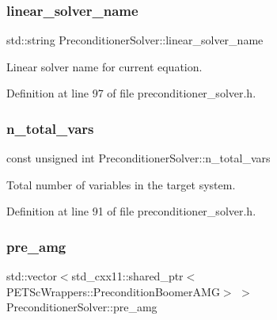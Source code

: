 \subsubsection{\texorpdfstring{linear\+\_\+solver\+\_\+name}{linear\_solver\_name}}
{\footnotesize\ttfamily std\+::string Preconditioner\+Solver\+::linear\+\_\+solver\+\_\+name\hspace{0.3cm}{\ttfamily [private]}}



Linear solver name for current equation. 



Definition at line 97 of file preconditioner\+\_\+solver.\+h.

\mbox{\label{class_preconditioner_solver_ac2c59527a78b06037f0eb18132d8be63}} 
\subsubsection{\texorpdfstring{n\+\_\+total\+\_\+vars}{n\_total\_vars}}
{\footnotesize\ttfamily const unsigned int Preconditioner\+Solver\+::n\+\_\+total\+\_\+vars\hspace{0.3cm}{\ttfamily [private]}}



Total number of variables in the target system. 



Definition at line 91 of file preconditioner\+\_\+solver.\+h.

\mbox{\label{class_preconditioner_solver_a235b12fcd8e5978c1a3df8c76d05808b}} 
\subsubsection{\texorpdfstring{pre\+\_\+amg}{pre\_amg}}
{\footnotesize\ttfamily std\+::vector$<$std\+\_\+cxx11\+::shared\+\_\+ptr$<$P\+E\+T\+Sc\+Wrappers\+::\+Precondition\+Boomer\+A\+MG$>$ $>$ Preconditioner\+Solver\+::pre\+\_\+amg\hspace{0.3cm}{\ttfamily [private]}}



